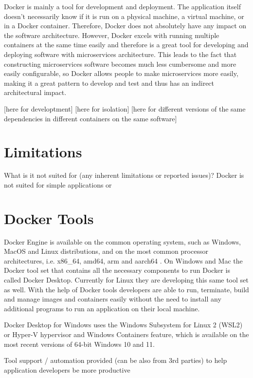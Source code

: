 \documentclass[fleqn,12pt]{olplainarticle}
\begin{document}
Docker is mainly a tool for development and deployment. The application itself doesn't necessarily know if it is run on a physical machine, a virtual machine, or in a Docker container. Therefore, Docker does not absolutely have any impact on the software architecture. However, Docker excels with running multiple containers at the same time easily and therefore is a great tool for developing and deploying software with microservices architecture. This leads to the fact
that constructing microservices software becomes much less cumbersome and more easily configurable, so Docker allows people to make microservices more easily, making it a great pattern to develop and test and thus has an indirect architectural impact.

[here for developtment]
[here for isolation]
[here for different versions of the same dependencies in different containers on the same software]

\section{Limitations}

What is it not suited for (any inherent limitations or reported issues)?
Docker is not suited for simple applications or  

\section{Docker Tools}

Docker Engine is available on the common operating system, such as Windows, MacOS and Linux distributions, and on the most common processor architectures, i.e. x86\_64, amd64, arm and aarch64 \cite{docker:install}.  On Windows and Mac the Docker tool set that contains all the necessary components to run Docker is called Docker Desktop. Currently for Linux they are developing this same tool set as well. With the help of Docker tools developers are able to run, terminate, build and manage images and containers easily without the need to install any additional programs to run an application on their local machine.

Docker Desktop for Windows uses the Windows Subsystem for Linux 2 (WSL2) or Hyper-V hypervisor and Windows Containers feature, which is available on the most recent versions of 64-bit Windows 10 and 11\cite{docker:windows}.

Tool support / automation provided (can be also from 3rd parties) to help application developers be more productive


\end{document}
